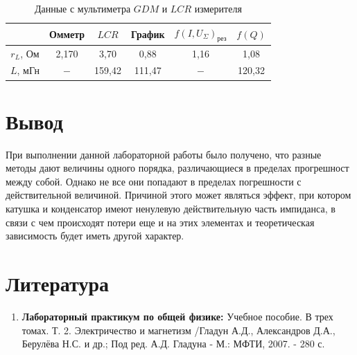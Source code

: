 \documentclass[a4paper, 12pt]{article}%
\begin{document}
\begin{itemize}
\begin{table}[!h]
\begin{center}
\begin{tabular}{|c|c|c|c|c|c|}
\hline & Омметр & $LCR$ & График  & $f\left(I, U_{\Sigma}\right)_{\text{рез}}$ & $f(Q)$ \\
\hline \hline$r_{L}$, Ом & 2,170 &3,70 & 0,88 & 1,16 & 1,08 \\
$L$, мГн & $-$ & 159,42 & 111,47 & $-$ & 120,32\\
\hline
\end{tabular}
\caption{Данные с мультиметра $GDM$ и $LCR$ измерителя}
\end{center} 
\end{table}

\end{itemize}


\section{Вывод}

При выполнении данной лабораторной работы было получено, что разные методы дают величины одного порядка, различающиеся в пределах прогрешност между собой. Однако не все они попадают в пределах погрешности с действительной величиной. Причиной этого может являться эффект, при котором катушка и конденсатор имеют ненулевую действительную часть импиданса, в связи с чем происходят потери еще и на этих элементах и теоретическая зависимость будет иметь другой характер.

\section{Литература}

\begin{enumerate}
\item \textbf{Лабораторный практикум по общей физике:} Учебное пособие. В трех томах. Т. 2. Электричество и магнетизм /Гладун А.Д., Александров Д.А., Берулёва Н.С. и др.; Под ред. А.Д. Гладуна - М.: МФТИ, 2007. - 280 с.
\end{enumerate}		
		
					
\end{document}
